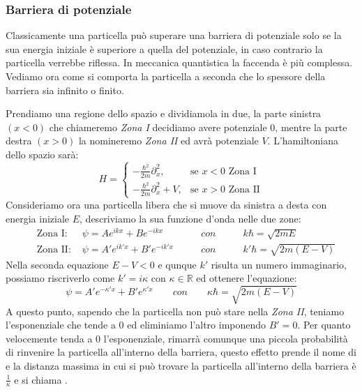 \subsubsection{Barriera di potenziale}
Classicamente una particella può superare una barriera di potenziale solo se la sua energia iniziale è superiore a quella del potenziale, in caso contrario la particella verrebbe riflessa. In meccanica quantistica la faccenda è più complessa. Vediamo ora come si comporta la particella a seconda che lo spessore della barriera sia infinito o finito.

Prendiamo una regione dello spazio e dividiamola in due, la parte sinistra $(x < 0)$ che chiameremo \textit{Zona I} decidiamo avere potenziale $0$, mentre la parte destra $(x > 0)$ la nomineremo \textit{Zona II} ed avrà potenziale $V$. L'hamiltoniana dello spazio sarà:
$$H=\begin{cases} - \frac{\hbar^2}{2m} \partial_x^2, & \mbox{se } x<0 \mbox{ Zona I} \\ - \frac{\hbar^2}{2m} \partial_x^2 + V, & \mbox{se } x>0 \mbox{ Zona II}
\end{cases}$$
Consideriamo ora una particella libera che si muove da sinistra a desta con energia iniziale $E$, descriviamo la sua funzione d'onda nelle due zone:
\begin{equation}
\begin{aligned}
  \quad \mbox{Zona I: }  &\psi = Ae^{ikx} + Be^{-ikx} \qquad & con \qquad & k\hbar = \sqrt{2mE}\\
  \quad \mbox{Zona II: } &\psi = A'e^{ik'x} + B'e^{-ik'x} \qquad & con \qquad & k'\hbar = \sqrt{2m(E-V)}
\end{aligned}
\end{equation}
Nella seconda equazione $E - V < 0$ e qunque $k'$ risulta un numero immaginario, possiamo riscriverlo come $k' = i \kappa$ con $\kappa \in \mathbb{R}$ ed ottenere l'equazione:
$$\psi = A'e^{-\kappa'x} + B'e^{\kappa'x} \qquad  con \qquad \kappa\hbar = \sqrt{2m(E-V)}$$
A questo punto, sapendo che la particella non può stare nella \textit{Zona II}, teniamo l'esponenziale che tende a $0$ ed eliminiamo l'altro imponendo $B' = 0$. Per quanto velocemente tenda a $0$ l'esponenziale, rimarrà comunque una piccola probabilità di rinvenire la particella all'interno della barriera, questo effetto prende il nome di  e la distanza massima in cui si può trovare la particella all'interno della barriera è $\frac{1}{\kappa}$ e si chiama .

